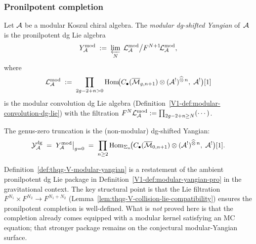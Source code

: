 \subsubsection{Pronilpotent completion}

\begin{definition}
\label{def:thqg-V-modular-yangian}
Let $\mathcal{A}$ be a modular Koszul chiral algebra.
The \emph{modular dg-shifted Yangian} of~$\mathcal{A}$ is the pronilpotent
dg Lie algebra
\begin{equation}%
\Ymod_\cA
\;:=\;
\varprojlim_N\;
\mathcal{L}_\cA^{\mathrm{mod}} \big/ F^{N+1}\!
 \mathcal{L}_\cA^{\mathrm{mod}},
\end{equation}
where
\begin{equation}%
\mathcal{L}_\cA^{\mathrm{mod}}
\;:=\;
\prod_{2g-2+n > 0}
\Hom\!\bigl(
 C_\bullet(\overline{\mathcal{M}}_{g,n+1})
 \otimes (\cA^!)^{\widehat{\otimes}\,n},\;
 \cA^!
\bigr)[1]
\end{equation}
is the modular convolution dg Lie algebra
\textup{(}Definition~\textup{\ref*{V1-def:modular-convolution-dg-lie})}
with the filtration
$F^N \mathcal{L}_{\mathcal{A}}^{\mathrm{mod}}
:= \prod_{2g-2+n \geq N}(\cdots)$.

The genus-zero truncation is the
(non-modular) dg-shifted Yangian:
\begin{equation}%
\Ydg_\cA
\;=\;
\Ymod_\cA\big|_{g=0}
\;=\;
\prod_{n \geq 2}
\Hom_{\Sigma_n}\!\bigl(
 C_\bullet(\overline{\mathcal{M}}_{0,n+1})
 \otimes (\cA^!)^{\widehat{\otimes}\,n},\;
 \cA^!
\bigr)[1].
\end{equation}
\end{definition}

\begin{remark}
Definition~\ref{def:thqg-V-modular-yangian} is a restatement
of the ambient pronilpotent dg Lie package in
Definition~\ref*{V1-def:modular-yangian-pro} in the gravitational
context. The key structural point is that the Lie filtration
$F^{N_1} \times F^{N_2} \to F^{N_1 + N_2}$
(Lemma~\ref{lem:thqg-V-collision-lie-compatibility}) ensures the
pronilpotent completion is well-defined. What is \emph{not} proved
here is that the completion already comes equipped with a modular
kernel satisfying an MC equation; that stronger package remains on the
conjectural modular-Yangian surface.
\end{remark}

